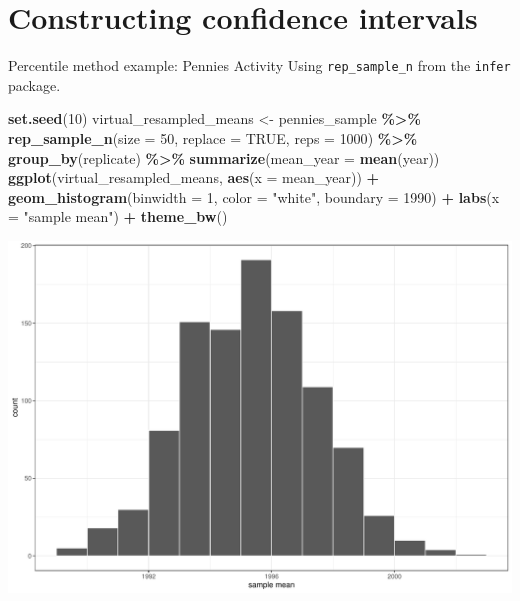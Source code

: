 \documentclass[
  ignorenonframetext,
]{beamer}
\newenvironment{Shaded}{\begin{snugshade}}{\end{snugshade}}
\newcommand{\AttributeTok}[1]{\textcolor[rgb]{0.13,0.29,0.53}{#1}}
\newcommand{\ConstantTok}[1]{\textcolor[rgb]{0.56,0.35,0.01}{#1}}
\newcommand{\DecValTok}[1]{\textcolor[rgb]{0.00,0.00,0.81}{#1}}
\newcommand{\FunctionTok}[1]{\textcolor[rgb]{0.13,0.29,0.53}{\textbf{#1}}}
\newcommand{\NormalTok}[1]{#1}
\newcommand{\OtherTok}[1]{\textcolor[rgb]{0.56,0.35,0.01}{#1}}
\newcommand{\SpecialCharTok}[1]{\textcolor[rgb]{0.81,0.36,0.00}{\textbf{#1}}}
\newcommand{\StringTok}[1]{\textcolor[rgb]{0.31,0.60,0.02}{#1}}
\begin{document}
\hypertarget{constructing-confidence-intervals}{%
\section{Constructing confidence
intervals}\label{constructing-confidence-intervals}}

\begin{frame}[fragile]{Percentile method example: Pennies Activity}
\protect\hypertarget{percentile-method-example-pennies-activity}{}
Using \texttt{rep\_sample\_n} from the \texttt{infer} package.

\tiny

\begin{Shaded}
\begin{Highlighting}[]
\FunctionTok{set.seed}\NormalTok{(}\DecValTok{10}\NormalTok{)}
\NormalTok{virtual\_resampled\_means }\OtherTok{\textless{}{-}}\NormalTok{ pennies\_sample }\SpecialCharTok{\%\textgreater{}\%} 
  \FunctionTok{rep\_sample\_n}\NormalTok{(}\AttributeTok{size =} \DecValTok{50}\NormalTok{, }\AttributeTok{replace =} \ConstantTok{TRUE}\NormalTok{, }\AttributeTok{reps =} \DecValTok{1000}\NormalTok{) }\SpecialCharTok{\%\textgreater{}\%} 
  \FunctionTok{group\_by}\NormalTok{(replicate) }\SpecialCharTok{\%\textgreater{}\%} 
  \FunctionTok{summarize}\NormalTok{(}\AttributeTok{mean\_year =} \FunctionTok{mean}\NormalTok{(year))}
\FunctionTok{ggplot}\NormalTok{(virtual\_resampled\_means, }\FunctionTok{aes}\NormalTok{(}\AttributeTok{x =}\NormalTok{ mean\_year)) }\SpecialCharTok{+}
  \FunctionTok{geom\_histogram}\NormalTok{(}\AttributeTok{binwidth =} \DecValTok{1}\NormalTok{, }\AttributeTok{color =} \StringTok{"white"}\NormalTok{, }\AttributeTok{boundary =} \DecValTok{1990}\NormalTok{) }\SpecialCharTok{+}
  \FunctionTok{labs}\NormalTok{(}\AttributeTok{x =} \StringTok{"sample mean"}\NormalTok{) }\SpecialCharTok{+}
  \FunctionTok{theme\_bw}\NormalTok{()}
\end{Highlighting}
\end{Shaded}

\begin{center}\includegraphics[width=0.6\linewidth,height=0.4\textheight]{Week10A_files/figure-beamer/unnamed-chunk-12-1} \end{center}
\normalsize
\end{frame}
\end{document}
